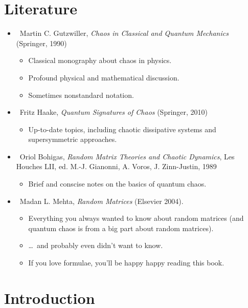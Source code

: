 \documentclass[a4paper,11pt,twoside]{article}
\begin{document}
\section{Literature}
\begin{itemize}
    \item \cite{Gut90}~Martin C. Gutzwiller, {\it Chaos in Classical and Quantum Mechanics} (Springer, 1990)
        \begin{itemize}
            \item Classical monography about chaos in physics.
            \item Profound physical and mathematical discussion.
            \item Sometimes nonstandard notation.
        \end{itemize}

    \item \cite{Haa10}~Fritz Haake, {\it Quantum Signatures of Chaos} (Springer, 2010)
        \begin{itemize}
            \item Up-to-date topics, including chaotic dissipative systems and supersymmetric approaches.
        \end{itemize}

    \item \cite{Boh89}~Oriol Bohigas, {\it Random Matrix Theories and Chaotic Dynamics}, Les Houches LII, ed. M.-J. Gianonni, A. Voros, J. Zinn-Justin, 1989
        \begin{itemize}
            \item Brief and conscise notes on the basics of quantum chaos.
        \end{itemize}

    \item \cite{Meh04}~Madan L. Mehta, {\it Random Matrices} (Elsevier 2004).
        \begin{itemize}
            \item Everything you always wanted to know about random matrices (and quantum chaos is from a big part about random matrices).
            \item \dots~and probably even didn't want to know.
            \item If you love formulae, you'll be happy happy reading this book.
        \end{itemize}

    \end{itemize}

\section{Introduction}
\end{document}
